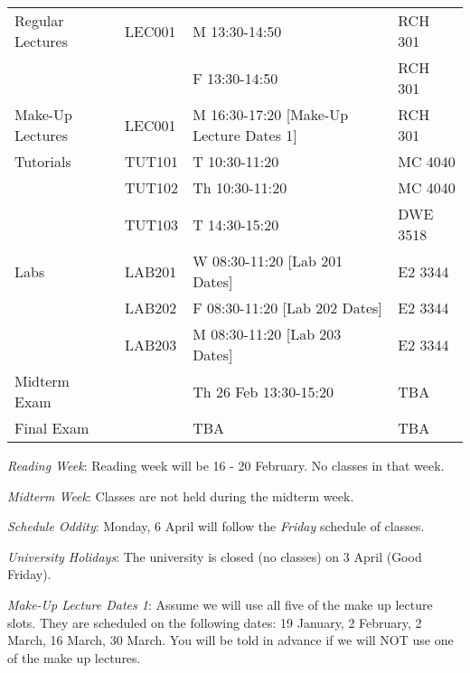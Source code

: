 \documentclass[letterpaper,10pt]{article}
\begin{document}
\begin{table}[h]
        \begin{center}
        \begin{tabular}{l|l|l|l}


                 Regular Lectures & LEC001 & M 13:30-14:50 & RCH 301         \\
                                  &        & F 13:30-14:50 & RCH 301         \\
             \hline
                 Make-Up Lectures & LEC001 & M 16:30-17:20 [Make-Up Lecture Dates 1] & RCH 301         \\
                 \hline
                 Tutorials        & TUT101 & T   10:30-11:20 & MC 4040         \\
                                  & TUT102 & Th	 10:30-11:20 & MC 4040         \\
                                  & TUT103 & T   14:30-15:20 & DWE 3518        \\
                 \hline
                 Labs             & LAB201 & W 08:30-11:20 [Lab 201 Dates]          & E2 3344         \\
                                  & LAB202 & F 08:30-11:20 [Lab 202 Dates]          & E2 3344         \\
                                  & LAB203 & M 08:30-11:20 [Lab 203 Dates]          & E2 3344         \\
            \hline
            Midterm Exam          &        & Th 26 Feb 13:30-15:20 & TBA \\
            \hline
            Final Exam            &        & TBA                              & TBA       \\
          \end{tabular}
        \end{center}
\end{table}

\textit{Reading Week}: Reading week will be 16 - 20 February. No classes in that week.

\textit{Midterm Week}: Classes are not held during the midterm week.

\textit{Schedule Oddity}: Monday, 6 April will follow the \textit{Friday} schedule of classes.



\textit{University Holidays}: The university is closed (no classes) on 3 April (Good Friday).

\textit{Make-Up Lecture Dates 1}: Assume we will use all five of the make up lecture slots. They are scheduled on the following dates: 19 January, 2 February, 2 March, 16 March, 30 March. You will be told in advance if we will NOT use one of the make up lectures.
\end{document}
